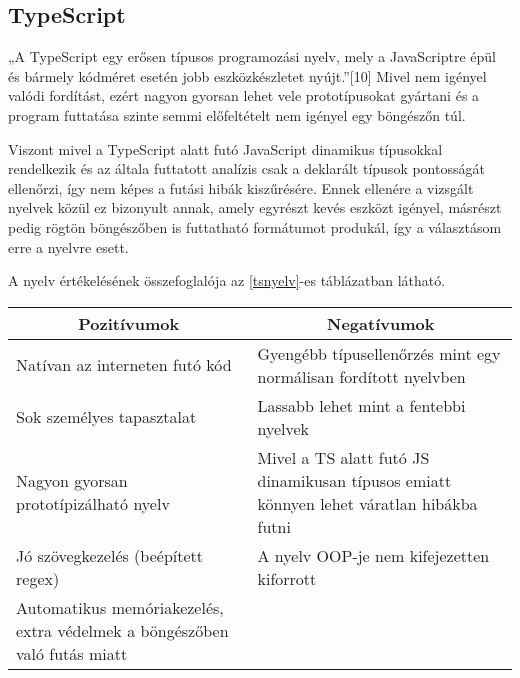 \newpage

\subsection{TypeScript}

„A TypeScript egy erősen típusos programozási nyelv, mely a JavaScriptre épül és bármely kódméret esetén jobb eszközkészletet nyújt.”[10] Mivel nem igényel valódi fordítást, ezért nagyon gyorsan lehet vele prototípusokat gyártani és a program futtatása szinte semmi előfeltételt nem igényel egy böngészőn túl.

Viszont mivel a TypeScript alatt futó JavaScript dinamikus típusokkal rendelkezik és az általa futtatott analízis csak a deklarált típusok pontosságát ellenőrzi, így nem képes a futási hibák kiszűrésére. Ennek ellenére a vizsgált nyelvek közül ez bizonyult annak, amely egyrészt kevés eszközt igényel, másrészt pedig rögtön böngészőben is futtatható formátumot produkál, így a választásom erre a nyelvre esett.

A nyelv értékelésének összefoglalója az \ref{tsnyelv}-es táblázatban látható.

\begin{center}
  \begin{tabularx}{\textwidth}{X X}
    \hline
    \multicolumn{1}{c}{\bfseries{Pozitívumok}} & \multicolumn{1}{c}{\bfseries{Negatívumok}}                                               \\
    \hline
    Natívan az interneten futó kód             & Gyengébb típusellenőrzés mint egy normálisan fordított nyelvben                          \\
    Sok személyes tapasztalat                  & Lassabb lehet mint a fentebbi nyelvek                                                    \\
    Nagyon gyorsan prototípizálható nyelv      & Mivel a TS alatt futó JS dinamikusan típusos emiatt könnyen lehet váratlan hibákba futni \\
    Jó szövegkezelés (beépített regex)         & A nyelv OOP-je nem kifejezetten kiforrott                                                \\
    Automatikus memóriakezelés, extra védelmek a böngészőben való futás miatt                                                             \\
    \hline
  \end{tabularx}
\end{center}